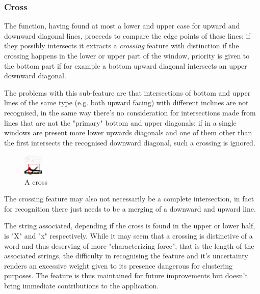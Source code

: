\subsubsection{Cross}
The function, having found at most a lower and upper case for upward and downward diagonal lines, proceeds to compare the edge points of these lines: if they possibly intersects it extracts a \emph{crossing} feature with distinction if the crossing happens in the lower or upper part of the window, priority is given to the bottom part if for example a bottom upward diagonal intersects an upper downward diagonal. 

The problems with this sub-feature are that intersections of bottom and upper lines of the same type (e.g. both upward facing) with different inclines are not recognised, in the same way there's no consideration for intersections made from lines that are not the "primary" bottom and upper diagonals: if in a single windows are present more lower upwards diagonals and one of them other than the first intersects the recognised downward diagonal, such a crossing is ignored.

\begin{figure}
  \vspace{-20pt}
  \begin{center}
    \includegraphics[width=0.08\textwidth]{images/cross.jpg}
  \end{center}
  \vspace{-20pt}
  \caption{A cross}
  \vspace{-10pt}
\end{figure}


The crossing feature may also not necessarily be a complete intersection, in fact for recognition there just needs to be a merging of a downward and upward line. 

The string associated, depending if the cross is found in the upper or lower half, is "X" and "x" respectively.
While it may seem that a crossing is distinctive of a word and thus deserving of more "characterizing force", that is the length of the associated strings, the difficulty in recognising the feature and it's uncertainty renders an excessive weight given to its presence dangerous for clustering purposes.
The feature is thus maintained for future improvements but doesn't bring immediate 
contributions to the application.

